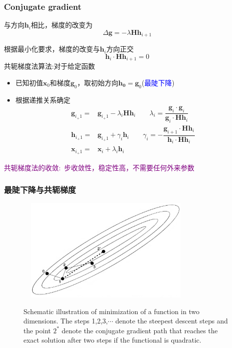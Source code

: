\documentclass[cjk,slidestop,compress,mathserif,blue]{beamer}
\begin{document}
\frame
{
	\frametitle{\textrm{Conjugate gradient}}
	与方向$\mathbf{h}_i$相比，梯度的改变为
	\begin{displaymath}
		\Delta\mathbf{g}=-\lambda\mathbf{H}\mathbf{h}_{i+1}
	\end{displaymath}

	根据最小化要求，梯度的改变与$\mathbf{h}_i$方向正交
	\begin{displaymath}
		\mathbf{h}_i\cdot\mathbf{H}\mathbf{h}_{i+1}=0
	\end{displaymath}
	共轭梯度法算法:对于给定函数
	\begin{itemize}
		\item 已知初值$\mathbf{x}_0$和梯度$\mathbf{g}_0$，取初始方向$\mathbf{h_0}=\mathbf{g}_0$(\textcolor{blue}{最陡下降})
		\item 根据递推关系确定
			\begin{displaymath}
				\begin{aligned}
					\mathbf{g}_{i_+1}=&\mathbf{g}_{i_+1}-\lambda_i\mathbf{H}\mathbf{h}_{i}\qquad \lambda_i=\dfrac{\mathbf{g}_i\cdot\mathbf{g}_i}{\mathbf{g}_i\cdot\mathbf{H}\mathbf{h}_i}\\	
					\mathbf{h}_{i_+1}=&\mathbf{g}_{i_+1}+\gamma_i\mathbf{h}_{i}\qquad \gamma_i=-\dfrac{\mathbf{g}_{i+1}\cdot\mathbf{H}\mathbf{h}_i}{\mathbf{h}_i\cdot\mathbf{H}\mathbf{h}_i}\\	
					\mathbf{x}_{i_+1}=&\mathbf{x}_{i}+\lambda_i\mathbf{h}_{i}
				\end{aligned}
			\end{displaymath}
	\end{itemize}
	\textcolor{purple}{共轭梯度法的收敛:~步收敛性，稳定性高，不需要任何外来参数}
}

\frame
{
	\frametitle{最陡下降与共轭梯度}
\begin{figure}[h!]
\centering
\includegraphics[height=2.0in,width=3.5in,viewport=0 0 950 590,clip]{Figures/OP_descent_CG.png}
\label{decent_CG}
\caption{\tiny \textrm{Schematic illustration of minimization of a function in two dimensions. The steps 1,2,3,$\cdots$ denote the steepest descent steps and the point $2^{\ast}$ denote the conjugate gradient path that reaches the exact solution after two steps if the functional is quadratic.}}%
\end{figure}
}
\end{document}
